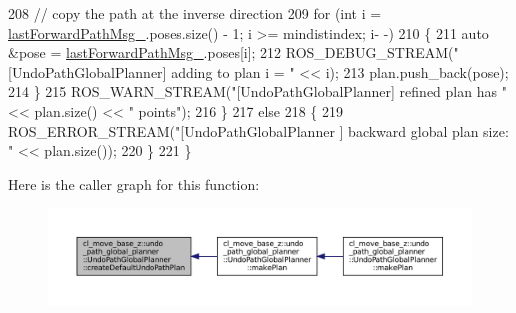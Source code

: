 \begin{DoxyCode}
208                 \textcolor{comment}{// copy the path at the inverse direction}
209                 \textcolor{keywordflow}{for} (\textcolor{keywordtype}{int} i = \hyperlink{classcl__move__base__z_1_1undo__path__global__planner_1_1UndoPathGlobalPlanner_a9a4a6e40f5b6cb5f77dedbc5b6170871}{lastForwardPathMsg\_}.poses.size() - 1; i >= mindistindex; i-
      -)
210                 \{
211                     \textcolor{keyword}{auto} &pose = \hyperlink{classcl__move__base__z_1_1undo__path__global__planner_1_1UndoPathGlobalPlanner_a9a4a6e40f5b6cb5f77dedbc5b6170871}{lastForwardPathMsg\_}.poses[i];
212                     ROS\_DEBUG\_STREAM(\textcolor{stringliteral}{"[UndoPathGlobalPlanner] adding to plan i = "} << i);
213                     plan.push\_back(pose);
214                 \}
215                 ROS\_WARN\_STREAM(\textcolor{stringliteral}{"[UndoPathGlobalPlanner] refined plan has "} << plan.size() << \textcolor{stringliteral}{"  points"});
216             \}
217             \textcolor{keywordflow}{else}
218             \{
219                 ROS\_ERROR\_STREAM(\textcolor{stringliteral}{"[UndoPathGlobalPlanner ] backward global plan size:  "} << plan.size());
220             \}
221         \}
\end{DoxyCode}
Here is the caller graph for this function\+:
\nopagebreak
\begin{figure}[H]
\begin{center}
\leavevmode
\includegraphics[width=350pt]{classcl__move__base__z_1_1undo__path__global__planner_1_1UndoPathGlobalPlanner_a659c16f439d33ac7026a54bb65c26ca8_icgraph}
\end{center}
\end{figure}
\mbox{\label{classcl__move__base__z_1_1undo__path__global__planner_1_1UndoPathGlobalPlanner_a69e0fbb98872f108f679b2a6620638f5}} 
